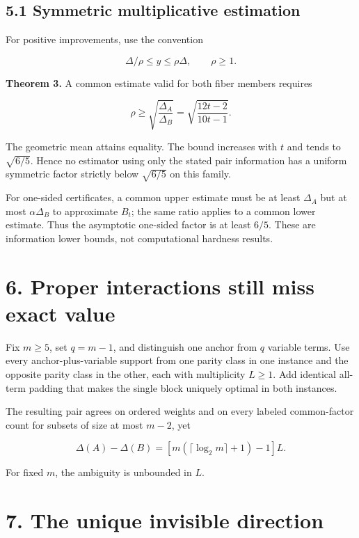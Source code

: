 \documentclass[
  11pt,
]{article}
\begin{document}
\hypertarget{symmetric-multiplicative-estimation}{%
\subsection{5.1 Symmetric multiplicative
estimation}\label{symmetric-multiplicative-estimation}}

For positive improvements, use the convention

\[
\Delta/\rho\le y\le\rho\Delta,
\qquad \rho\ge1.
\]

\textbf{Theorem 3.} A common estimate valid for both fiber members
requires

\[
\rho\ge
\sqrt{\frac{\Delta_A}{\Delta_B}}
=\sqrt{\frac{12t-2}{10t-1}}.
\]

The geometric mean attains equality. The bound increases with \(t\) and
tends to \(\sqrt{6/5}\). Hence no estimator using only the stated pair
information has a uniform symmetric factor strictly below \(\sqrt{6/5}\)
on this family.

For one-sided certificates, a common upper estimate must be at least
\(\Delta_A\) but at most \(\alpha\Delta_B\) to approximate \(B_t\); the
same ratio applies to a common lower estimate. Thus the asymptotic
one-sided factor is at least \(6/5\). These are information lower
bounds, not computational hardness results.

\hypertarget{proper-interactions-still-miss-exact-value}{%
\section{6. Proper interactions still miss exact
value}\label{proper-interactions-still-miss-exact-value}}

Fix \(m\ge5\), set \(q=m-1\), and distinguish one anchor from \(q\)
variable terms. Use every anchor-plus-variable support from one parity
class in one instance and the opposite parity class in the other, each
with multiplicity \(L\ge1\). Add identical all-term padding that makes
the single block uniquely optimal in both instances.

The resulting pair agrees on ordered weights and on every labeled
common-factor count for subsets of size at most \(m-2\), yet

\[
\Delta(A)-\Delta(B)
=\left[m(\lceil\log_2m\rceil+1)-1\right]L.
\]

For fixed \(m\), the ambiguity is unbounded in \(L\).

\hypertarget{the-unique-invisible-direction}{%
\section{7. The unique invisible
direction}\label{the-unique-invisible-direction}}
\end{document}
